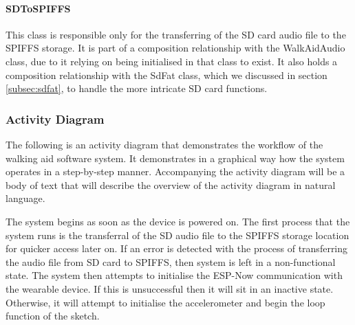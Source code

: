                \paragraph{SDToSPIFFS}\mbox{}

                    This class is responsible only for the transferring of the SD card audio file to the SPIFFS storage. It is part of a composition relationship with the WalkAidAudio class, due to it relying on being initialised in that class to exist. It also holds a composition relationship with the SdFat class, which we discussed in section \ref{subsec:sdfat}, to handle the more intricate SD card functions. 
                
                \newpage

            \subsubsection{Activity Diagram}
            \label{subsubsec:walking_aid_activity}

                The following is an activity diagram that demonstrates the workflow of the walking aid software system. It demonstrates in a graphical way how the system operates in a step-by-step manner. Accompanying the activity diagram will be a body of text that will describe the overview of the activity diagram in natural language.

                
            
                The system begins as soon as the device is powered on. The first process that the system runs is the transferral of the SD audio file to the SPIFFS storage location for quicker access later on. If an error is detected with the process of transferring the audio file from SD card to SPIFFS, then system is left in a non-functional state. The system then attempts to initialise the ESP-Now communication with the wearable device. If this is unsuccessful then it will sit in an inactive state. Otherwise, it will attempt to initialise the accelerometer and begin the loop function of the sketch. 

